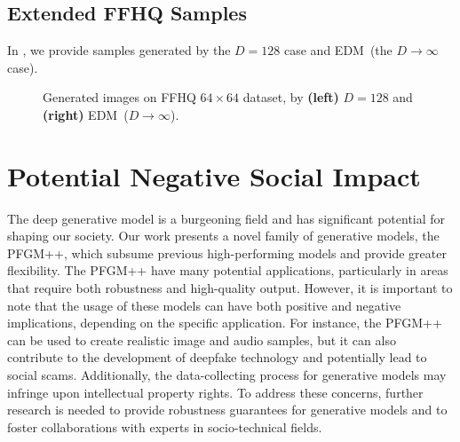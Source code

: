 \subsection{Extended FFHQ Samples}

In , we provide samples generated by the $D=128$ case and EDM~(the $D\to \infty$ case).
\begin{figure*}
\centering
    \hfill
    \caption{Generated images on FFHQ $64\times 64$ dataset, by \textbf{(left)} $D=128$ and \textbf{(right)} EDM~($D\to \infty$).}
    \label{fig:ffhq-vis}
\end{figure*}


\section{Potential Negative Social Impact}
\label{app:impact}

The deep generative model is a burgeoning field and has significant potential for shaping our society. Our work presents a novel family of generative models, the PFGM++, which subsume previous high-performing models and provide greater flexibility. The PFGM++ have many potential applications, particularly in areas that require both robustness and high-quality output. However, it is important to note that the usage of these models can have both positive and negative implications, depending on the specific application. For instance, the PFGM++ can be used to create realistic image and audio samples, but it can also contribute to the development of deepfake technology and potentially lead to social scams. Additionally, the data-collecting process for generative models may infringe upon intellectual property rights. To address these concerns, further research is needed to provide robustness guarantees for generative models and to foster collaborations with experts in socio-technical fields.
